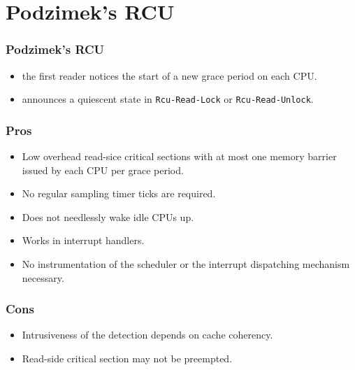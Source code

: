 \documentclass{beamer}
\begin{document}
\section{Podzimek's RCU}


\begin{frame}[t]
  \frametitle{Podzimek's RCU}

  \begin{itemize}
  \item the first reader notices the start of a new grace period on each CPU.
  \item announces a quiescent state in \texttt{Rcu-Read-Lock} or \texttt{Rcu-Read-Unlock}.
  \end{itemize}
  
\end{frame}


\begin{frame}[t]
  \frametitle{Pros}

  \begin{itemize}
  \item Low overhead read-sice critical sections with at most one memory barrier
    issued by each CPU per grace period.
  \item No regular sampling timer ticks are required.
  \item Does not needlessly wake idle CPUs up.
  \item Works in interrupt handlers.
  \item No instrumentation of the scheduler or the interrupt dispatching mechanism
    necessary.
  \end{itemize}
  
\end{frame}


\begin{frame}[t]
  \frametitle{Cons}

  \begin{itemize}
  \item Intrusiveness of the detection depends on cache coherency.
  \item Read-side critical section may not be preempted.
  \end{itemize}
  
\end{frame}
\end{document}
